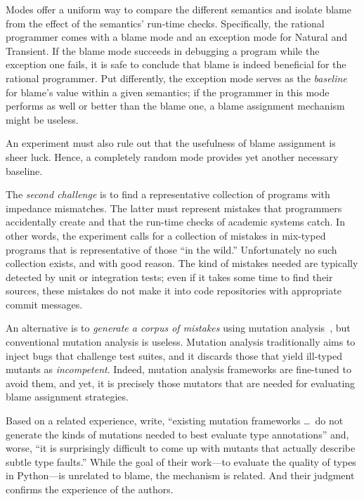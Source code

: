 Modes offer a uniform way to compare the different semantics and isolate blame
from the effect of the semantics' run-time checks. Specifically, the rational
programmer comes with a blame mode and an exception mode for Natural and
Transient. If the blame mode succeeds in debugging a program while the exception
one fails, it is safe to conclude that blame is indeed beneficial for the
rational programmer. Put differently, the exception mode serves as the {\em
baseline\/} for blame's value within a given semantics; if the programmer in
this mode performs as well or better than the blame one, a blame assignment
mechanism might be useless.

An experiment must also rule out that the usefulness of blame assignment is sheer
luck.  Hence, a completely random mode provides yet another necessary baseline.

The {\em second challenge\/} is to find a representative collection of
programs with impedance mismatches. The latter must represent mistakes that programmers
accidentally create and that the run-time checks of academic systems catch. In
other words, the experiment calls for a collection of mistakes in
mix-typed programs that is representative of those ``in the wild.''
Unfortunately no such collection exists, and with good reason. The kind of
mistakes needed are typically detected by unit or integration tests; even if it
takes some time to find their sources, these mistakes do not make it into code
repositories with appropriate commit messages.

An alternative is to {\em generate a corpus of 
mistakes \/} using mutation analysis~\citep{lipton1971fault, demillo1978hints,
jia2011analysis}, but conventional mutation analysis is useless.  Mutation
analysis traditionally aims to inject bugs that challenge test suites, and it
discards those that yield ill-typed mutants as \emph{incompetent}. Indeed,
mutation analysis frameworks are fine-tuned to avoid them, and yet, it is
precisely those mutators that are needed for evaluating blame assignment strategies.

Based on a related experience, \citet{gw-mutation} write,
``existing mutation frameworks \ldots\ do not generate the kinds of mutations
needed to best evaluate type annotations'' and, worse, ``it is surprisingly
difficult to come up with mutants that actually describe subtle type faults.''
While the goal of their work---to evaluate the quality of types in
Python---is unrelated to blame, the mechanism is related. And their
judgment confirms the experience of the authors. 

